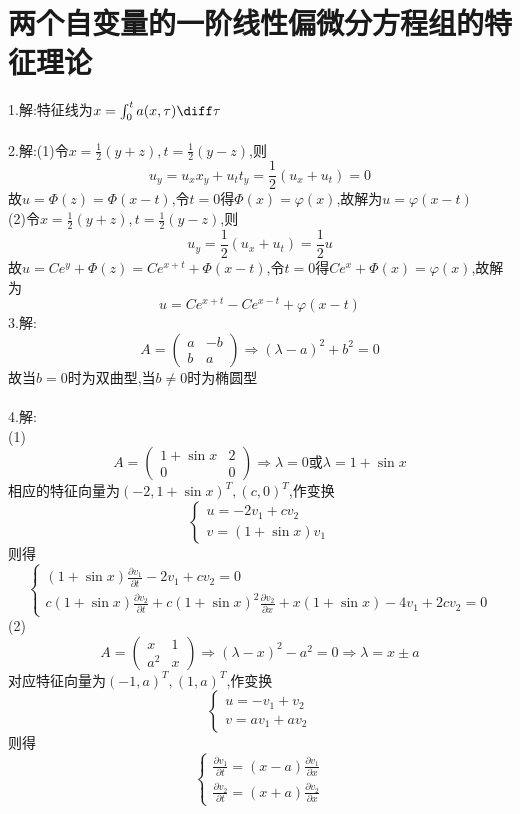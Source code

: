 \section{两个自变量的一阶线性偏微分方程组的特征理论}
1.解:特征线为$x=\int_0^ta(x,\tau)\diff\tau$\\\\
2.解:(1)令$x=\frac{1}{2}(y+z),t=\frac{1}{2}(y-z)$,则
\[u_y=u_xx_y+u_tt_y=\frac{1}{2}(u_x+u_t)=0\]
故$u=\Phi(z)=\Phi(x-t)$,令$t=0$得$\Phi(x)=\varphi(x)$,故解为$u=\varphi(x-t)$\\
(2)令$x=\frac{1}{2}(y+z),t=\frac{1}{2}(y-z)$,则
\[u_y=\frac{1}{2}(u_x+u_t)=\frac{1}{2}u\]
故$u=Ce^y+\Phi(z)=Ce^{x+t}+\Phi(x-t)$,令$t=0$得$Ce^x+\Phi(x)=\varphi(x)$,故解为
\[u=Ce^{x+t}-Ce^{x-t}+\varphi(x-t)\]
\newline
3.解:
\[A=\begin{pmatrix}
a&-b\\b&a
\end{pmatrix}\Rightarrow(\lambda-a)^2+b^2=0\]
故当$b=0$时为双曲型,当$b\neq0$时为椭圆型\\\\
4.解:\\
(1)\[A=\begin{pmatrix}
1+\sin x&2\\0&0\end{pmatrix}\Rightarrow\lambda=0\mbox{或}\lambda=1+\sin x\]
相应的特征向量为$(-2,1+\sin x)^T,(c,0)^T$,作变换
\[\begin{cases}
u=-2v_1+cv_2\\
v=(1+\sin x)v_1
\end{cases}\]
则得
\[\begin{cases}
(1+\sin x)\frac{\partial v_1}{\partial t}-2v_1+cv_2=0\\
c(1+\sin x)\frac{\partial v_2}{\partial t}+c(1+\sin x)^2\frac{\partial v_2}{\partial x}+x(1+\sin x)-4v_1+2cv_2=0
\end{cases}\]
(2)\[A=\begin{pmatrix}
x&1\\a^2&x
\end{pmatrix}\Rightarrow(\lambda-x)^2-a^2=0\Rightarrow\lambda=x\pm a\]
对应特征向量为$(-1,a)^T,(1,a)^T$,作变换
\[\begin{cases}
u=-v_1+v_2\\
v=av_1+av_2
\end{cases}\]
则得
\[\begin{cases}
\frac{\partial v_1}{\partial t}=(x-a)\frac{\partial v_1}{\partial x}\\
\frac{\partial v_2}{\partial t}=(x+a)\frac{\partial v_2}{\partial x}
\end{cases}\]
